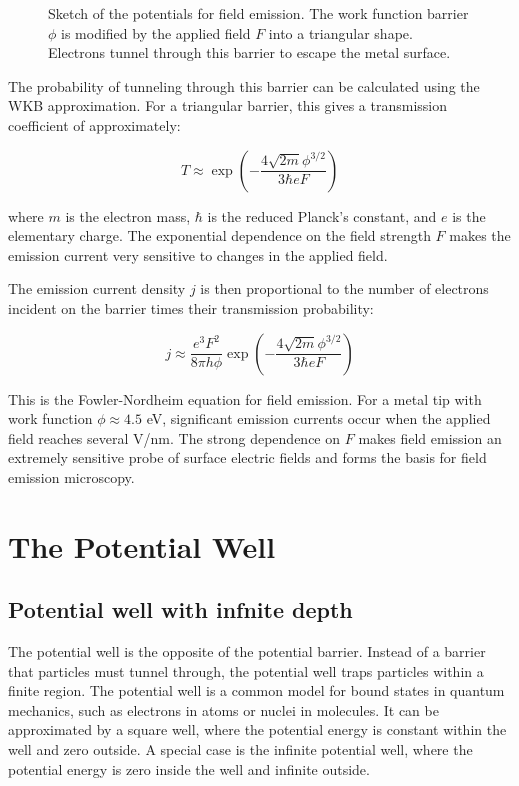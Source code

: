 \documentclass[
  a4paper,
]{book}
\begin{document}
\begin{tcolorbox}
\begin{figure}[H]
{}

\caption{\label{fig-field_emission}Sketch of the potentials for field
emission. The work function barrier \(\phi\) is modified by the applied
field \(F\) into a triangular shape. Electrons tunnel through this
barrier to escape the metal surface.}

\end{figure}%

The probability of tunneling through this barrier can be calculated
using the WKB approximation. For a triangular barrier, this gives a
transmission coefficient of approximately:

\[T \approx \exp\left(-\frac{4\sqrt{2m}\phi^{3/2}}{3\hbar eF}\right)\]

where \(m\) is the electron mass, \(\hbar\) is the reduced Planck's
constant, and \(e\) is the elementary charge. The exponential dependence
on the field strength \(F\) makes the emission current very sensitive to
changes in the applied field.

The emission current density \(j\) is then proportional to the number of
electrons incident on the barrier times their transmission probability:

\[j \approx \frac{e^3F^2}{8\pi h\phi}\exp\left(-\frac{4\sqrt{2m}\phi^{3/2}}{3\hbar eF}\right)\]

This is the Fowler-Nordheim equation for field emission. For a metal tip
with work function \(\phi \approx 4.5\) eV, significant emission
currents occur when the applied field reaches several V/nm. The strong
dependence on \(F\) makes field emission an extremely sensitive probe of
surface electric fields and forms the basis for field emission
microscopy.

\end{tcolorbox}

\section{The Potential Well}\label{the-potential-well}

\subsection{Potential well with infnite
depth}\label{potential-well-with-infnite-depth}

The potential well is the opposite of the potential barrier. Instead of
a barrier that particles must tunnel through, the potential well traps
particles within a finite region. The potential well is a common model
for bound states in quantum mechanics, such as electrons in atoms or
nuclei in molecules. It can be approximated by a square well, where the
potential energy is constant within the well and zero outside. A special
case is the infinite potential well, where the potential energy is zero
inside the well and infinite outside.
\end{document}
